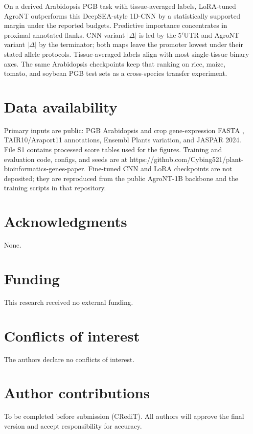 \documentclass[9pt,twocolumn,twoside,lineno]{gsag3jnl}
\begin{document}
On a derived Arabidopsis PGB task with tissue-averaged labels, LoRA-tuned AgroNT outperforms this DeepSEA-style 1D-CNN by a statistically supported margin under the reported budgets. Predictive importance concentrates in proximal annotated flanks. CNN variant $|\Delta|$ is led by the 5$'$UTR and AgroNT variant $|\Delta|$ by the terminator; both maps leave the promoter lowest under their stated allele protocols. Tissue-averaged labels align with most single-tissue binary axes. The same Arabidopsis checkpoints keep that ranking on rice, maize, tomato, and soybean PGB test sets as a cross-species transfer experiment.

\section*{Data availability}

Primary inputs are public: PGB Arabidopsis and crop gene-expression FASTA \citep{pgb2024}, TAIR10/Araport11 annotations, Ensembl Plants variation, and JASPAR 2024. File S1 contains processed score tables used for the figures. Training and evaluation code, configs, and seeds are at https://github.com/Cybing521/plant-bioinformatics-genes-paper. Fine-tuned CNN and LoRA checkpoints are not deposited; they are reproduced from the public AgroNT-1B backbone and the training scripts in that repository.

\section*{Acknowledgments}

None.

\section*{Funding}

This research received no external funding.

\section*{Conflicts of interest}

The authors declare no conflicts of interest.

\section*{Author contributions}

To be completed before submission (CRediT). All authors will approve the final version and accept responsibility for accuracy.
\end{document}
